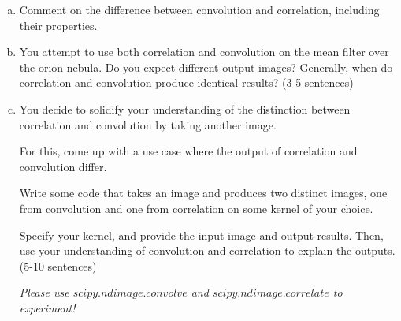 \begin{enumerate}[(a)]
    \item Comment on the difference between convolution and correlation, including their properties. 
    
    
    \item You attempt to use both correlation and convolution on the mean filter over the orion nebula. Do you expect different output images? Generally, when do correlation and convolution produce identical results? (3-5 sentences)
    

    \item
    You decide to solidify your understanding of the distinction between correlation and convolution by taking another image.
    
    For this, come up with a use case where the output of correlation and convolution differ.
    
    Write some code that takes an image and produces two distinct images, one from convolution and one from correlation on some kernel of your choice. 
    
    Specify your kernel, and provide the input image and output results. Then, use your understanding of convolution and correlation to explain the outputs. (5-10 sentences)

    \emph{Please use \href{https://docs.scipy.org/doc/scipy/reference/generated/scipy.ndimage.convolve.html}{$scipy.ndimage.convolve$} and \href{https://docs.scipy.org/doc/scipy/reference/generated/scipy.ndimage.correlate.html}{$scipy.ndimage.correlate$} to experiment!}
    

\end{enumerate}




